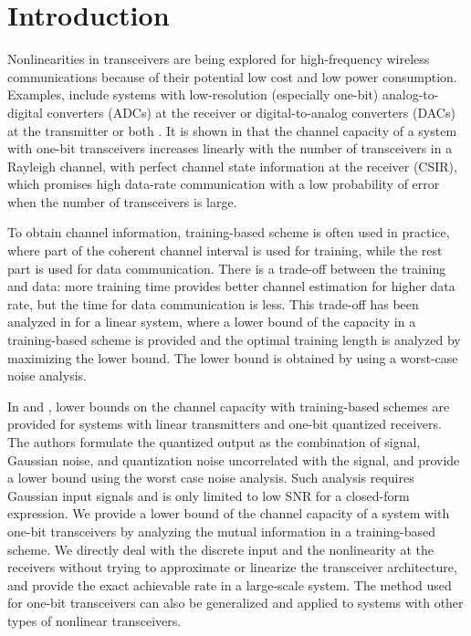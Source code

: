 \documentclass[conference]{IEEEtran}
\begin{document}
\section{Introduction}
Nonlinearities in transceivers are being explored for high-frequency wireless communications because of their potential low cost and low power consumption. Examples, include systems with low-resolution (especially one-bit) analog-to-digital converters (ADCs) at the receiver \cite{nossek2006capacity,li2017channel,li2016much,wen2016bayes} or digital-to-analog converters (DACs) at the transmitter \cite{saxena2017analysis,li2017downlink,jacobsson2017massive,kong2018nonlinear} or both \cite{gao2017power,gao2018beamforming,kong2018multipair,gao2018capacity}. It is shown in \cite{gao2018capacity} that the channel capacity of a system with one-bit transceivers increases linearly with the number of transceivers in a Rayleigh channel, with perfect channel state information at the receiver (CSIR), which promises high data-rate communication with a low probability of error when the number of transceivers is large.

To obtain channel information, training-based scheme is often used in practice, where part of the coherent channel interval is used for training, while the rest part is used for data communication.
There is a trade-off between the training and data:  more training time provides better channel estimation for higher data rate, but the time for data communication is less. This trade-off has been analyzed in \cite{hassibi2003much} for a linear system, where a lower bound of the capacity in a training-based scheme is provided and the optimal training length is analyzed by maximizing the lower bound. The lower bound is obtained by using a worst-case noise analysis.

In \cite{li2017channel} and \cite{li2016much}, lower bounds on the channel capacity with training-based schemes are provided for systems with linear transmitters and one-bit quantized receivers. The authors formulate the quantized output as the combination of signal, Gaussian noise, and quantization noise uncorrelated with the signal, and provide a lower bound using the worst case noise analysis. Such analysis requires Gaussian input signals and is only limited to low SNR for a closed-form expression. We provide a lower bound of the channel capacity of a system with one-bit transceivers by analyzing the mutual information in a training-based scheme. We directly deal with the discrete input and the nonlinearity at the receivers without trying to approximate or linearize the transceiver architecture, and provide the exact achievable rate in a large-scale system.  The method used for one-bit transceivers can also be generalized and applied to systems with other types of nonlinear transceivers.
\end{document}
